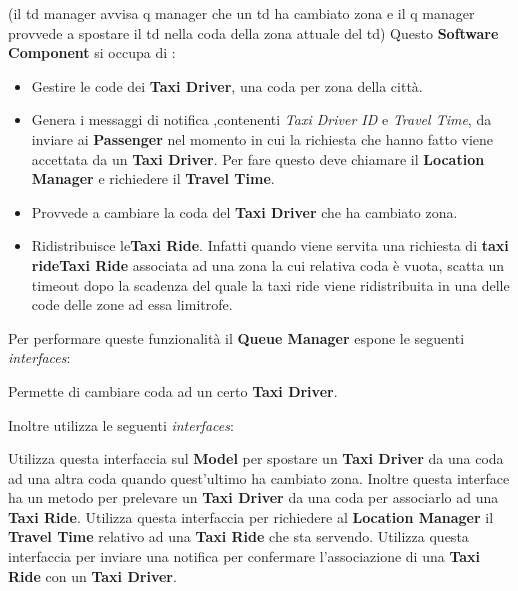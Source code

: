 \begin{itemize}
\begin{itemize}
		 (il td manager avvisa q manager che un td ha cambiato zona e il q manager provvede a spostare il td nella coda della zona attuale del td)
		 Questo \textbf{Software Component} si occupa di :
		\begin{itemize}
			\item Gestire le code dei \textbf{Taxi Driver}, una coda per zona della città.
			\item Genera i messaggi di notifica ,contenenti \textit{Taxi Driver ID} e \textit{Travel Time}, da inviare ai \textbf{Passenger} nel momento in cui la richiesta che hanno fatto viene accettata da un \textbf{Taxi Driver}. 
			Per fare questo deve chiamare il \textbf{Location Manager} e richiedere il \textbf{Travel Time}.
			\item Provvede a cambiare la coda del \textbf{Taxi Driver} che ha cambiato zona.
			\item Ridistribuisce le\textbf{Taxi Ride}. Infatti quando viene servita una richiesta di \textbf{taxi rideTaxi Ride} associata ad una zona la cui relativa coda è vuota, scatta un timeout dopo la scadenza del quale la taxi ride viene ridistribuita in una delle code delle zone ad essa limitrofe.
		\end{itemize}
		Per performare queste funzionalità il \textbf{Queue Manager} espone le seguenti \textit{interfaces}:
		\begin{itemize}
			 Permette di cambiare coda ad un certo \textbf{Taxi Driver}.
		\end{itemize}
		Inoltre utilizza le seguenti \textit{interfaces}:
		\begin{itemize}
			 Utilizza questa interfaccia sul \textbf{Model} per spostare un \textbf{Taxi Driver} da una coda ad una altra coda quando quest'ultimo ha cambiato zona. 
			Inoltre questa interface ha un metodo per prelevare un \textbf{Taxi Driver} da una coda per associarlo ad una \textbf{Taxi Ride}.
			 Utilizza questa interfaccia per richiedere al \textbf{Location Manager} il \textbf{Travel Time} relativo ad una \textbf{Taxi Ride} che sta servendo.
			 Utilizza questa interfaccia per inviare una notifica per confermare l'associazione di una \textbf{Taxi Ride} con un \textbf{Taxi Driver}.
		\end{itemize}
		

\end{itemize}
\end{itemize}
